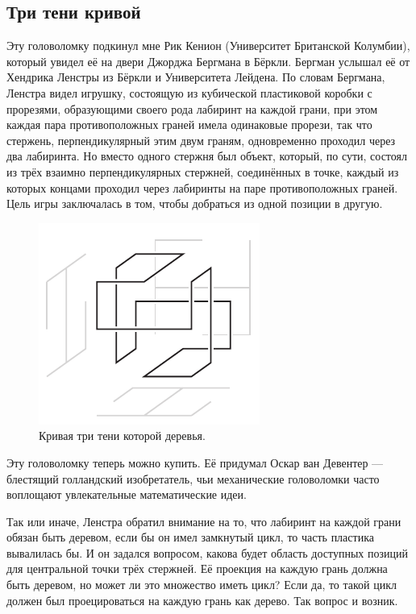 \subsection*{Три тени кривой}

Эту головоломку подкинул мне Рик Кенион (Университет Британской Колумбии), который увидел её на двери Джорджа Бергмана в Бёркли. 
Бергман услышал её от Хендрика Ленстры из Бёркли и Университета Лейдена.
По словам Бергмана, Ленстра видел игрушку, состоящую из кубической пластиковой коробки с прорезями, образующими своего рода лабиринт на каждой грани, при этом каждая пара противоположных граней имела одинаковые прорези, так что стержень, перпендикулярный этим двум граням, одновременно проходил через два лабиринта.
Но вместо одного стержня был объект, который, по сути, состоял из трёх взаимно перпендикулярных стержней, соединённых в точке, каждый из которых концами проходил через лабиринты на паре противоположных граней.
Цель игры заключалась в том, чтобы добраться из одной позиции в другую.

\begin{figure}[htb!]
\centering
\includegraphics[scale=1]{pics/tree3}
\caption{Кривая три тени которой деревья.}
\label{pic:tree3}
\end{figure}

Эту головоломку теперь можно купить.
Её придумал Оскар ван Девентер --- блестящий голландский изобретатель, чьи механические головоломки часто воплощают увлекательные математические идеи.

Так или иначе, Ленстра обратил внимание на то, что лабиринт на каждой грани обязан быть деревом,
если бы он имел замкнутый цикл, то часть пластика вывалилась бы.
И он задался вопросом, какова будет область доступных позиций для центральной точки трёх стержней.
Её проекция на каждую грань должна быть деревом, но может ли это множество иметь цикл?
Если да, то такой цикл должен был проецироваться на каждую грань как дерево.
Так вопрос и возник.

